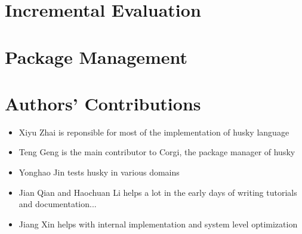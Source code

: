 \documentclass[11pt, oneside]{article}   	%
\theoremstyle{definition}
\begin{document}
\section{Incremental Evaluation}

\section{Package Management}

\section{Authors' Contributions}

\begin{itemize}
	\item Xiyu Zhai is reponsible for most of the implementation of husky language
	\item Teng Geng is the main contributor to Corgi, the package manager of husky
	\item Yonghao Jin tests husky in various domains
	\item Jian Qian and Haochuan Li helps a lot in the early days of writing tutorials and documentation...
	\item Jiang Xin helps with internal implementation and system level optimization
\end{itemize}
\end{document}
